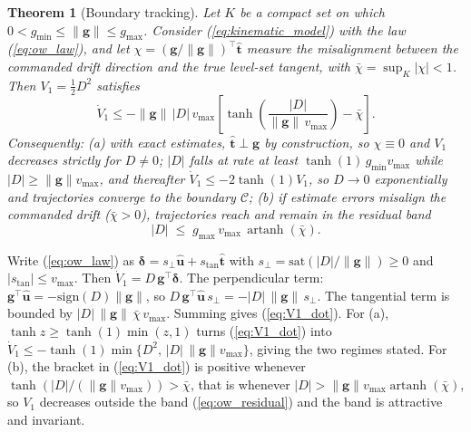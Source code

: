\documentclass[lettersize,journal]{IEEEtran}
\newtheorem{theorem}{Theorem}
\begin{document}
\begin{theorem}[Boundary tracking]
\label{thm:ow}
Let $K$ be a compact set on which $0 < g_{\min} \leq \|\mathbf{g}\| \leq
g_{\max}$. Consider (\ref{eq:kinematic_model}) with the law
(\ref{eq:ow_law}), and let $\chi = (\mathbf{g}/\|\mathbf{g}\|)^\top
\hat{\mathbf{t}}$ measure the misalignment between the commanded drift
direction and the true level-set tangent, with $\bar{\chi} = \sup_K
|\chi| < 1$. Then $V_1 = \tfrac{1}{2}D^2$ satisfies
\begin{equation}
    \dot{V}_1 \leq -\|\mathbf{g}\|\,|D|\,v_{\max}\left[
    \tanh\!\left(\frac{|D|}{\|\mathbf{g}\|\,v_{\max}}\right)
    - \bar{\chi}\right].
    \label{eq:V1_dot}
\end{equation}
Consequently:
(a) with exact estimates, $\hat{\mathbf{t}} \perp \mathbf{g}$ by
construction, so $\chi \equiv 0$ and $V_1$ decreases strictly for
$D \neq 0$; $|D|$ falls at rate at least $\tanh(1)\,g_{\min} v_{\max}$
while $|D| \geq \|\mathbf{g}\| v_{\max}$, and thereafter $\dot{V}_1
\leq -2\tanh(1)V_1$, so $D \to 0$ exponentially and trajectories
converge to the boundary $\mathcal{C}$;
(b) if estimate errors misalign the commanded drift ($\bar{\chi} > 0$),
trajectories reach and remain in the residual band
\begin{equation}
    |D| \;\leq\; g_{\max}\, v_{\max}\,
    \operatorname{artanh}(\bar{\chi}).
    \label{eq:ow_residual}
\end{equation}
\end{theorem}

\begin{IEEEproof}
Write (\ref{eq:ow_law}) as $\boldsymbol{\delta} = s_\perp
\hat{\mathbf{u}} + s_{\text{tan}} \hat{\mathbf{t}}$ with $s_\perp =
\mathrm{sat}(|D|/\|\mathbf{g}\|) \geq 0$ and $|s_{\text{tan}}| \leq
v_{\max}$. Then $\dot{V}_1 = D\,\mathbf{g}^\top \boldsymbol{\delta}$.
The perpendicular term: $\mathbf{g}^\top \hat{\mathbf{u}} =
-\mathrm{sign}(D)\|\mathbf{g}\|$, so $D\,\mathbf{g}^\top
\hat{\mathbf{u}}\, s_\perp = -|D|\,\|\mathbf{g}\|\, s_\perp$. The
tangential term is bounded by $|D|\,\|\mathbf{g}\|\,\bar{\chi}\,
v_{\max}$. Summing gives (\ref{eq:V1_dot}). For (a), $\tanh z \geq
\tanh(1)\min(z, 1)$ turns (\ref{eq:V1_dot}) into $\dot{V}_1 \leq
-\tanh(1)\min\{D^2,\, |D|\,\|\mathbf{g}\|v_{\max}\}$, giving the two
regimes stated. For (b), the bracket in (\ref{eq:V1_dot}) is positive
whenever $\tanh(|D|/(\|\mathbf{g}\|v_{\max})) > \bar{\chi}$, that is
whenever $|D| > \|\mathbf{g}\|v_{\max}\operatorname{artanh}
(\bar{\chi})$, so $V_1$ decreases outside the band
(\ref{eq:ow_residual}) and the band is attractive and invariant.
\end{IEEEproof}
\end{document}

